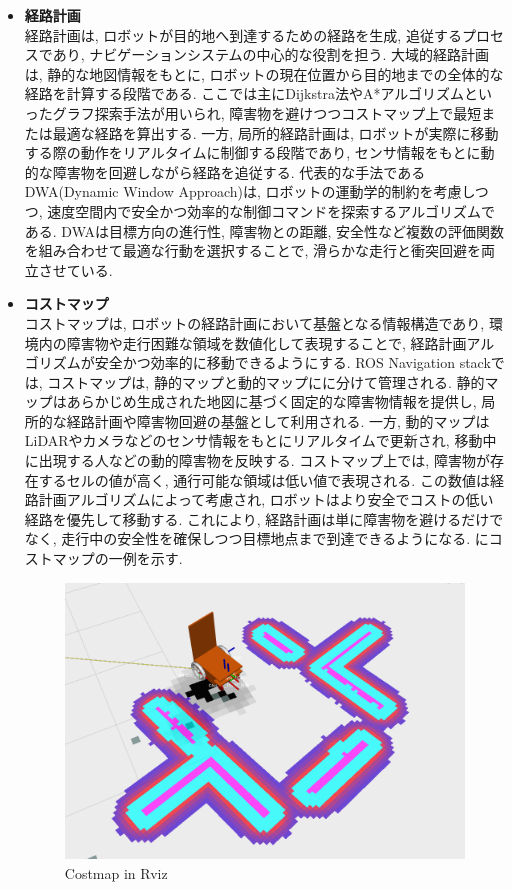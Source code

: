 \begin{itemize}
     \item \textbf{経路計画}\\
     経路計画は, ロボットが目的地へ到達するための経路を生成, 追従するプロセスであり, ナビゲーションシステムの中心的な役割を担う. 
     大域的経路計画は, 静的な地図情報をもとに, ロボットの現在位置から目的地までの全体的な経路を計算する段階である. 
     ここでは主にDijkstra法やA*アルゴリズムといったグラフ探索手法が用いられ, 障害物を避けつつコストマップ上で最短または最適な経路を算出する. 
     一方, 局所的経路計画は, ロボットが実際に移動する際の動作をリアルタイムに制御する段階であり, 
     センサ情報をもとに動的な障害物を回避しながら経路を追従する. 
     代表的な手法であるDWA(Dynamic Window Approach)は, ロボットの運動学的制約を考慮しつつ, 
     速度空間内で安全かつ効率的な制御コマンドを探索するアルゴリズムである. 
     DWAは目標方向の進行性, 障害物との距離, 安全性など複数の評価関数を組み合わせて最適な行動を選択することで, 
     滑らかな走行と衝突回避を両立させている. 
     \item \textbf{コストマップ}\\
     コストマップは, ロボットの経路計画において基盤となる情報構造であり, 環境内の障害物や走行困難な領域を数値化して表現することで, 
     経路計画アルゴリズムが安全かつ効率的に移動できるようにする. 
     ROS Navigation stackでは, コストマップは, 静的マップと動的マップにに分けて管理される. 
     静的マップはあらかじめ生成された地図に基づく固定的な障害物情報を提供し, 
     局所的な経路計画や障害物回避の基盤として利用される. 
     一方, 動的マップはLiDARやカメラなどのセンサ情報をもとにリアルタイムで更新され, 
     移動中に出現する人などの動的障害物を反映する. コストマップ上では, 
     障害物が存在するセルの値が高く, 通行可能な領域は低い値で表現される. 
     この数値は経路計画アルゴリズムによって考慮され, ロボットはより安全でコストの低い経路を優先して移動する. 
     これにより, 経路計画は単に障害物を避けるだけでなく, 走行中の安全性を確保しつつ目標地点まで到達できるようになる. 
     にコストマップの一例を示す. 
     \begin{figure}[hbtp]
     \centering
          \includegraphics[keepaspectratio, scale=0.2]
           {images/costmap.png}
          \caption{Costmap in Rviz}
          \label{Fig:costmap}
     \end{figure}     
\end{itemize}